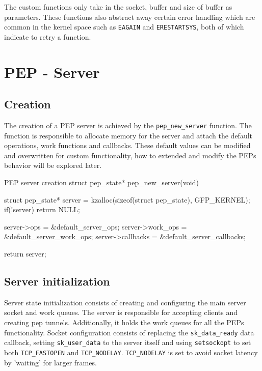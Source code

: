 \documentclass[a4paper,english, 12pt]{report}
\begin{document}
The custom functions only take in the socket, buffer and size of buffer as parameters. These functions also abstract away certain error handling which are common in the kernel space such as \verb|EAGAIN| and \verb|ERESTARTSYS|, both of which indicate to retry a function.

\section{PEP - Server}

\subsection{Creation}

The creation of a PEP server is achieved by the \verb|pep_new_server| function. The function is responsible to allocate memory for the server and attach the default operations, work functions and callbacks. These default values can be modified and overwritten for custom functionality, how to extended and modify the PEPs behavior will be explored later.

\begin{autonumlstlisting}[label=lst:pep_creation]{PEP server creation}
struct pep_state* pep_new_server(void)
{
    struct pep_state* server = kzalloc(sizeof(struct pep_state), GFP_KERNEL);
    if(!server){
        return NULL;
    }

    server->ops = &default_server_ops;
    server->work_ops = &default_server_work_ops;
    server->callbacks = &default_server_callbacks;

    return server;
}
\end{autonumlstlisting}

\subsection{Server initialization}
Server state initialization consists of creating and configuring the main server socket and work queues. The server is responsible for accepting clients and creating pep tunnels. Additionally, it holds the work queues for all the PEPs functionality. Socket configuration consists of replacing the \verb|sk_data_ready| data callback, setting \verb|sk_user_data| to the server itself and using \verb|setsockopt| to set both \verb|TCP_FASTOPEN| and \verb|TCP_NODELAY|. \verb|TCP_NODELAY| is set to avoid socket latency by 'waiting' for larger frames.
\end{document}
